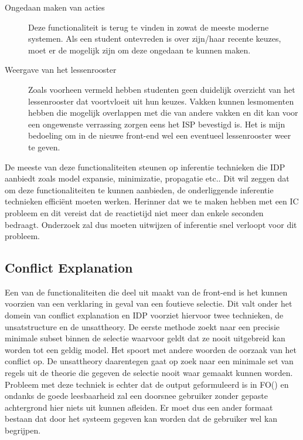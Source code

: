 \begin{description}
\item[Ongedaan maken van acties] Deze functionaliteit is terug te vinden in zowat de meeste moderne systemen. Als een student ontevreden is over zijn/haar recente keuzes, moet er de mogelijk zijn om deze ongedaan te kunnen maken. 
\item[Weergave van het lessenrooster] Zoals voorheen vermeld hebben studenten geen duidelijk overzicht van het lessenrooster dat voortvloeit uit hun keuzes. Vakken kunnen lesmomenten hebben die mogelijk overlappen met die van andere vakken en dit kan voor een ongewenste verrassing zorgen eens het ISP bevestigd is. Het is mijn bedoeling om in de nieuwe front-end wel een eventueel lessenrooster weer te geven.
\end{description}
De meeste van deze functionaliteiten steunen op inferentie technieken die IDP aanbiedt zoals model expansie, minimizatie, propagatie etc.. Dit wil zeggen dat om deze functionaliteiten te kunnen aanbieden, de onderliggende inferentie technieken effici\"{e}nt moeten werken. Herinner dat we te maken hebben met een IC probleem en dit vereist dat de reactietijd niet meer dan enkele seconden bedraagt. Onderzoek zal dus moeten uitwijzen of inferentie snel verloopt voor dit probleem.

\subsection{Conflict Explanation}
Een van de functionaliteiten die deel uit maakt van de front-end is het kunnen voorzien van een verklaring in geval van een foutieve selectie. Dit valt onder het domein van conflict explanation en IDP voorziet hiervoor twee technieken, de unsatstructure en de unsattheory. De eerste methode zoekt naar een precisie minimale subset binnen de selectie waarvoor geldt dat ze nooit uitgebreid kan worden tot een geldig model. Het spoort met andere woorden de oorzaak van het conflict op. De unsattheory daarentegen gaat op zoek naar een minimale set van regels uit de theorie die gegeven de selectie nooit waar gemaakt kunnen worden. Probleem met deze techniek is echter dat de output geformuleerd is in FO(\textperiodcentered) en ondanks de goede leesbaarheid zal een doorsnee gebruiker zonder gepaste achtergrond hier niets uit kunnen afleiden. Er moet dus een ander formaat bestaan dat door het systeem gegeven kan worden dat de gebruiker wel kan begrijpen. 

